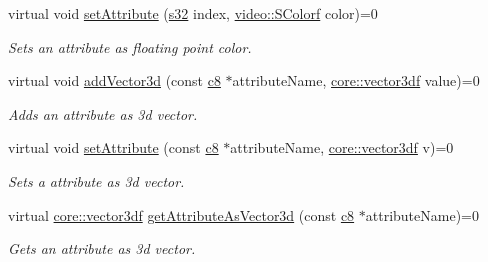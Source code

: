 \begin{DoxyCompactItemize}
\mbox{\label{classirr_1_1io_1_1IAttributes_a9f5e93e5ee0f270973de42ad32b0b616}} 
virtual void \hyperlink{classirr_1_1io_1_1IAttributes_a9f5e93e5ee0f270973de42ad32b0b616}{set\+Attribute} (\hyperlink{namespaceirr_ac66849b7a6ed16e30ebede579f9b47c6}{s32} index, \hyperlink{classirr_1_1video_1_1SColorf}{video\+::\+S\+Colorf} color)=0
\begin{DoxyCompactList}\small\item\em Sets an attribute as floating point color. \end{DoxyCompactList}\item 
\mbox{\label{classirr_1_1io_1_1IAttributes_aee73f5e51ad978b2bf146d10725da72f}} 
virtual void \hyperlink{classirr_1_1io_1_1IAttributes_aee73f5e51ad978b2bf146d10725da72f}{add\+Vector3d} (const \hyperlink{namespaceirr_a9395eaea339bcb546b319e9c96bf7410}{c8} $\ast$attribute\+Name, \hyperlink{namespaceirr_1_1core_a06f169d08b5c429f5575acb7edbad811}{core\+::vector3df} value)=0
\begin{DoxyCompactList}\small\item\em Adds an attribute as 3d vector. \end{DoxyCompactList}\item 
\mbox{\label{classirr_1_1io_1_1IAttributes_ac08a589c89febec76cfd942fad0bb519}} 
virtual void \hyperlink{classirr_1_1io_1_1IAttributes_ac08a589c89febec76cfd942fad0bb519}{set\+Attribute} (const \hyperlink{namespaceirr_a9395eaea339bcb546b319e9c96bf7410}{c8} $\ast$attribute\+Name, \hyperlink{namespaceirr_1_1core_a06f169d08b5c429f5575acb7edbad811}{core\+::vector3df} v)=0
\begin{DoxyCompactList}\small\item\em Sets a attribute as 3d vector. \end{DoxyCompactList}\item 
virtual \hyperlink{namespaceirr_1_1core_a06f169d08b5c429f5575acb7edbad811}{core\+::vector3df} \hyperlink{classirr_1_1io_1_1IAttributes_ac4ad5d4db7fd08e0523d3f8e671c2f68}{get\+Attribute\+As\+Vector3d} (const \hyperlink{namespaceirr_a9395eaea339bcb546b319e9c96bf7410}{c8} $\ast$attribute\+Name)=0
\begin{DoxyCompactList}\small\item\em Gets an attribute as 3d vector. \end{DoxyCompactList}\item 

\end{DoxyCompactItemize}
